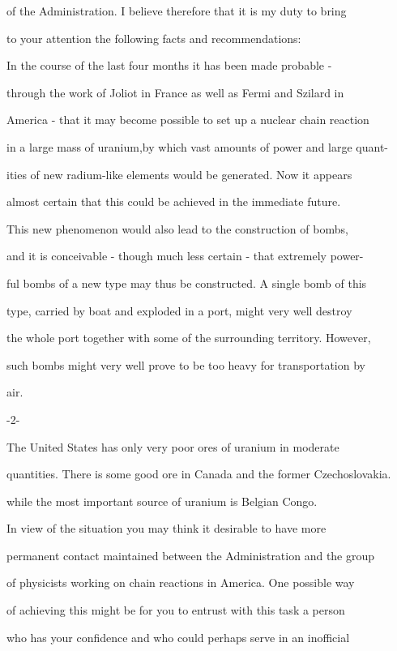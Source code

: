 \documentclass[12pt]{article}
\begin{document}
of the Administration. I believe therefore that it is my duty to bring

to your attention the following facts and recommendations:

      In the course of the last four months it has been made probable -

through the work of Joliot in France as well as Fermi and Szilard in

America - that it may become possible to set up a nuclear chain reaction

in a large mass of uranium,by which vast amounts of power and large quant-

ities of new radium-like elements would be generated. Now it appears

almost certain that this could be achieved in the immediate future.

      This new phenomenon would also lead to the construction of bombs,

and it is conceivable - though much less certain - that extremely power-

ful bombs of a new type may thus be constructed. A single bomb of this

type, carried by boat and exploded in a port, might very well destroy

the whole port together with some of the surrounding territory. However,

such bombs might very well prove to be too heavy for transportation by

air. 

 

                                 -2-

      The United States has only very poor ores of uranium in moderate

quantities. There is some good ore in Canada and the former Czechoslovakia.

while the most important source of uranium is Belgian Congo.

      In view of the situation you may think it desirable to have more

permanent contact maintained between the Administration and the group

of physicists  working on chain reactions in America. One possible way

of achieving this might be for you to entrust with this task a person

who has your confidence and who could perhaps serve in an inofficial
\end{document}
